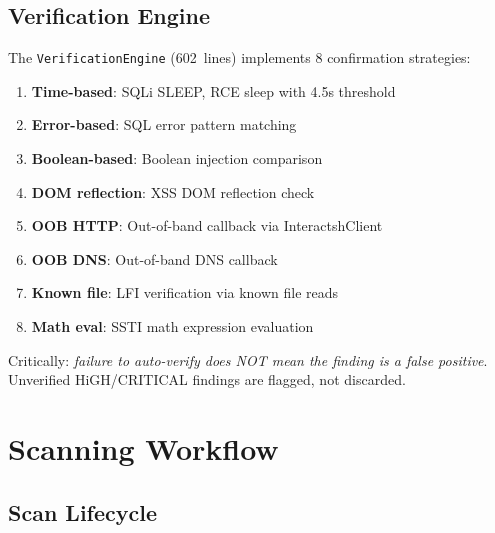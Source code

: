 \documentclass[12pt,a4paper]{report}
\begin{document}
\section{Verification Engine}
The \texttt{VerificationEngine} (602~lines) implements 8 confirmation strategies:
\begin{enumerate}[noitemsep]
  \item \textbf{Time-based}: SQLi SLEEP, RCE sleep with 4.5s threshold
  \item \textbf{Error-based}: SQL error pattern matching
  \item \textbf{Boolean-based}: Boolean injection comparison
  \item \textbf{DOM reflection}: XSS DOM reflection check
  \item \textbf{OOB HTTP}: Out-of-band callback via InteractshClient
  \item \textbf{OOB DNS}: Out-of-band DNS callback
  \item \textbf{Known file}: LFI verification via known file reads
  \item \textbf{Math eval}: SSTI math expression evaluation
\end{enumerate}

Critically: \emph{failure to auto-verify does NOT mean the finding is a false
positive}. Unverified HiGH/CRITICAL findings are flagged, not discarded.


\chapter{Scanning Workflow}
\label{ch:workflow}

\section{Scan Lifecycle}
\end{document}
